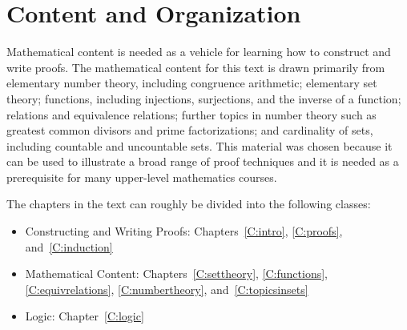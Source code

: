 \begin{enumerate}

\end{enumerate}

\section*{Content and Organization}

Mathematical content is needed as a vehicle for learning how to construct and write proofs.  The mathematical content for this text is drawn primarily from elementary number theory, including congruence arithmetic; elementary set theory; functions, including injections, surjections, and the inverse of a function; relations and equivalence relations; further topics in number theory such as greatest common divisors and prime factorizations; and cardinality of sets, including countable and uncountable sets.  This material was chosen because it can be used to illustrate a broad range of proof techniques and it is needed as a prerequisite for many upper-level mathematics courses.

The chapters in the text can roughly be divided into the following classes:

\begin{itemize}
\item Constructing and Writing Proofs:  Chapters~\ref{C:intro}, \ref{C:proofs}, and~\ref{C:induction}
\item Mathematical Content: Chapters~\ref{C:settheory}, \ref{C:functions}, \ref{C:equivrelations}, \ref{C:numbertheory}, and~\ref{C:topicsinsets}
\item Logic: Chapter~\ref{C:logic}
\end{itemize}

